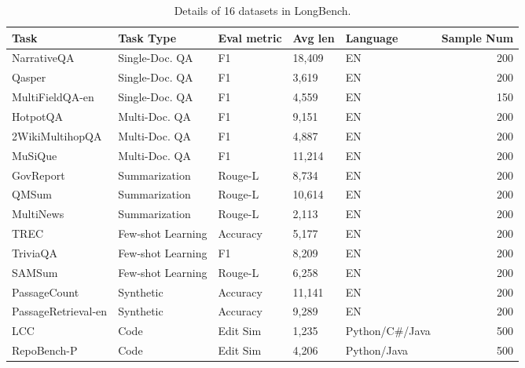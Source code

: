 \begin{table*}[thb!]
	\centering
	\small
		\caption{Details of 16 datasets in LongBench.}
	\label{tab:detail_datasets}
	\begin{tabular}{@{}lllllr@{}}
		\toprule
		Task                & Task Type     & Eval metric & Avg len & Language & Sample Num        \\ \midrule
		NarrativeQA         & Single-Doc. QA & F1          & 18,409   & EN       & 200            \\
		Qasper              & Single-Doc. QA & F1          & 3,619    & EN       & 200            \\
		MultiFieldQA-en     & Single-Doc. QA & F1          & 4,559    & EN       & 150            \\
		HotpotQA            & Multi-Doc. QA  & F1          & 9,151    & EN       & 200            \\
		2WikiMultihopQA     & Multi-Doc. QA  & F1          & 4,887    & EN       & 200            \\
		MuSiQue             & Multi-Doc. QA  & F1          & 11,214   & EN       & 200            \\
		GovReport           & Summarization & Rouge-L     & 8,734    & EN       & 200            \\
		QMSum               & Summarization & Rouge-L     & 10,614   & EN       & 200            \\
		MultiNews           & Summarization & Rouge-L     & 2,113    & EN       & 200            \\
		TREC                & Few-shot Learning & Accuracy    & 5,177    & EN       & 200            \\
		TriviaQA            & Few-shot Learning & F1          & 8,209    & EN       & 200            \\
		SAMSum              & Few-shot Learning & Rouge-L     & 6,258    & EN       & 200            \\
		PassageCount        & Synthetic     & Accuracy    & 11,141   & EN       & 200            \\
		PassageRetrieval-en & Synthetic     & Accuracy    & 9,289    & EN       & 200            \\
		LCC                 & Code          & Edit Sim    & 1,235      & Python/C\#/Java & 500\\
		RepoBench-P         & Code          & Edit Sim    & 4,206      & Python/Java & 500    \\ \bottomrule
	\end{tabular}
\end{table*}




